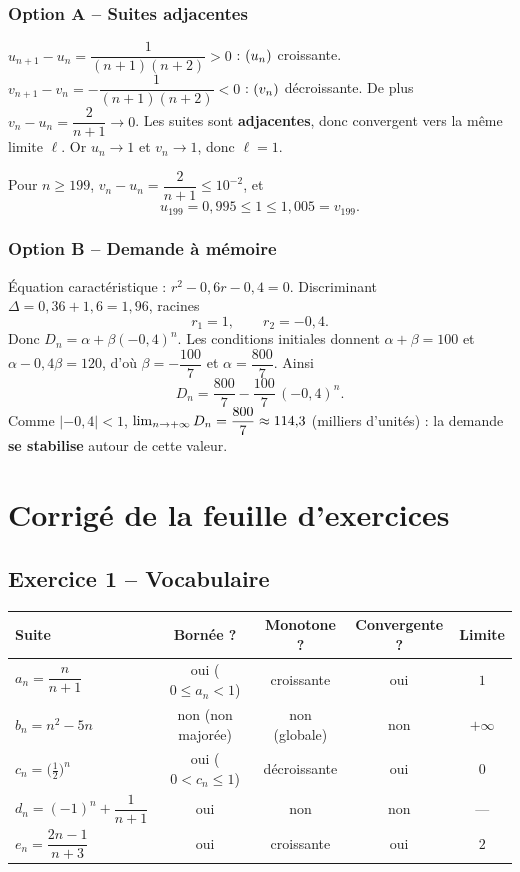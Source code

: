 \documentclass[11pt,a4paper]{article}
\begin{document}
\subsubsection*{Option A -- Suites adjacentes}

$u_{n+1}-u_n = \dfrac{1}{(n+1)(n+2)}>0$ : $(u_n)$ croissante. $v_{n+1}-v_n = -\dfrac{1}{(n+1)(n+2)}<0$ : $(v_n)$ décroissante. De plus $v_n-u_n = \dfrac{2}{n+1}\to 0$. Les suites sont \textbf{adjacentes}, donc convergent vers la même limite $\ell$. Or $u_n\to 1$ et $v_n\to 1$, donc $\ell=1$.

Pour $n\geq 199$, $v_n-u_n = \dfrac{2}{n+1}\leq 10^{-2}$, et
\[
u_{199} = 0{,}995 \leq 1 \leq 1{,}005 = v_{199}.
\]

\subsubsection*{Option B -- Demande à mémoire}

Équation caractéristique : $r^2-0{,}6r-0{,}4=0$. Discriminant $\Delta=0{,}36+1{,}6=1{,}96$, racines
\[
r_1=1, \qquad r_2=-0{,}4.
\]
Donc $D_n = \alpha + \beta (-0{,}4)^n$. Les conditions initiales donnent $\alpha+\beta=100$ et $\alpha-0{,}4\beta=120$, d'où $\beta=-\dfrac{100}{7}$ et $\alpha=\dfrac{800}{7}$. Ainsi
\[
D_n = \dfrac{800}{7} - \dfrac{100}{7}\,(-0{,}4)^n.
\]
Comme $\lvert -0{,}4\rvert<1$, $\lim_{n\to +\infty} D_n = \dfrac{800}{7}\approx 114{,}3$ (milliers d'unités) : la demande \textbf{se stabilise} autour de cette valeur.

\clearpage
\section{Corrigé de la feuille d'exercices}

\subsection{Exercice 1 -- Vocabulaire}

\begin{center}
\renewcommand{\arraystretch}{1.2}
\begin{tabular}{@{}lcccc@{}}
\toprule
Suite & Bornée ? & Monotone ? & Convergente ? & Limite \\
\midrule
$a_n=\dfrac{n}{n+1}$ & oui ($0\leq a_n<1$) & croissante & oui & $1$ \\
$b_n=n^2-5n$ & non (non majorée) & non (globale) & non & $+\infty$ \\
$c_n=\bigl(\tfrac12\bigr)^n$ & oui ($0<c_n\leq 1$) & décroissante & oui & $0$ \\
$d_n=(-1)^n+\dfrac{1}{n+1}$ & oui & non & non & --- \\
$e_n=\dfrac{2n-1}{n+3}$ & oui & croissante & oui & $2$ \\
\bottomrule
\end{tabular}
\end{center}
\end{document}
